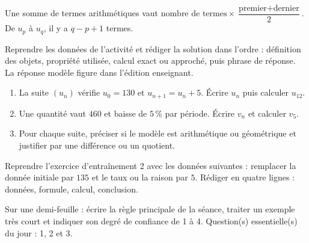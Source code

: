 \begin{traceecrite}Une somme de termes arithmétiques vaut $\text{nombre de termes}\times\dfrac{\text{premier}+\text{dernier}}2$. De $u_p$ à $u_q$, il y a $q-p+1$ termes.\end{traceecrite}

\begin{exemple}
Reprendre les données de l'activité et rédiger la solution dans l'ordre : définition des objets, propriété utilisée, calcul exact ou approché, puis phrase de réponse. La réponse modèle figure dans l'édition enseignant.
\end{exemple}

\begin{exercice}[-- essentiel]
\begin{enumerate}\item La suite $(u_n)$ vérifie $u_0=130$ et $u_{n+1}=u_n+5$. Écrire $u_n$ puis calculer $u_{12}$.\item Une quantité vaut $460$ et baisse de $5\,\%$ par période. Écrire $v_n$ et calculer $v_5$.\item Pour chaque suite, préciser si le modèle est arithmétique ou géométrique et justifier par une différence ou un quotient.\end{enumerate}
\end{exercice}


\begin{dm}Reprendre l'exercice d'entraînement 2 avec les données suivantes : remplacer la donnée initiale par $135$ et le taux ou la raison par $5$. Rédiger en quatre lignes : données, formule, calcul, conclusion.\end{dm}

\begin{sortie}Sur une demi-feuille : écrire la règle principale de la séance, traiter un exemple très court et indiquer son degré de confiance de 1 à 4. Question(s) essentielle(s) du jour : 1, 2 et 3.\end{sortie}

